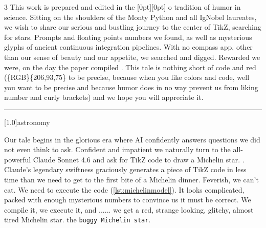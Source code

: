 \documentclass[11pt]{article}
\begin{document}
\begin{multicols}{3}
This work is prepared and edited in the \raisebox{0pt}[0pt][0pt]{%
o%
%
%
%
} tradition of humor in science. Sitting on the shoulders of the Monty Python and all IgNobel laureates, we wish to share our serious and bustling journey to the center of TikZ, searching for stars. Prompts and floating points numbers we found, as well as mysterious glyphs of ancient continuous integration pipelines. With no compass app, other than our sense of beauty and our appetite, we searched and digged. Rewarded we were, on the day the paper compiled \cite{fares2026unpackingsecurityscannersgithub}. This tale is nothing short of code and red (\{RGB\}\{206,93,75\} to be precise, because when you like colors and code, well you want to be precise and because humor does in no way prevent us from liking number and curly brackets) and we hope you will appreciate it.



\begin{centering}
\vspace{3mm}

\rule[3pt]{2em}{0.7pt}

\vspace{2mm}

\large \scalebox{1.2}[1.0]{astronomy}


    
\end{centering}


Our tale begins in the  glorious era where AI confidently answers questions we did not even think to ask. Confident and impatient we naturally turn to the all-powerful Claude Sonnet 4.6 and ask for TikZ code to draw a Michelin star. . Claude's legendary swiftness graciously generates a piece of TikZ code in less time than we need to get to the first bite of a Michelin dinner. Feverish, we can't eat. We need to execute the code (\autoref{lst:michelinmodel}). It looks complicated, packed with enough mysterious numbers to convince us it must be correct.  We compile it, we execute it, and ...... we get a red, strange looking, glitchy, almost tired Michelin star. the \texttt{buggy Michelin star}.


\end{multicols}
\end{document}
